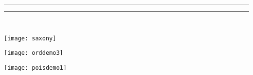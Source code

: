 \begin{center}
 \rule[-4pt]{0.5pt}{4pt}\hrulefill\rule[-4pt]{0.5pt}{4pt}\\
 \begin{minipage}[c]{.33\linewidth}
  \texttt{[image: saxony]}
 \end{minipage}%
 \hfill
 \begin{minipage}[c]{.33\linewidth}
  \texttt{[image: orddemo3]}
 \end{minipage}
 \hfill
 \begin{minipage}[c]{.33\linewidth}
  \texttt{[image: poisdemo1]}
 \end{minipage}
\end{center}

